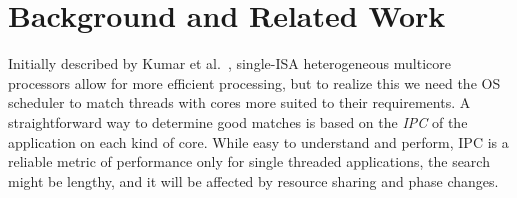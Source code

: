 \section{Background and Related Work}
\label{rw}

\begin{table}[htbp]
  \caption{Qualitative Analysis on Related Work}
  \begin{center}
  \label{rwt}
  \end{center}
\end{table}

Initially described by Kumar et al.~\cite{kumar2004single,kumar2003single}, single-ISA heterogeneous multicore processors allow for more efficient processing, but to realize this we need the OS scheduler to match threads with cores more suited to their requirements. A straightforward way to determine good matches is based on the \emph{IPC} of the application on each kind of core. While easy to understand and perform, IPC is a reliable metric of performance only for single threaded applications, the search might be lengthy, and it will be affected by resource sharing and phase changes.

